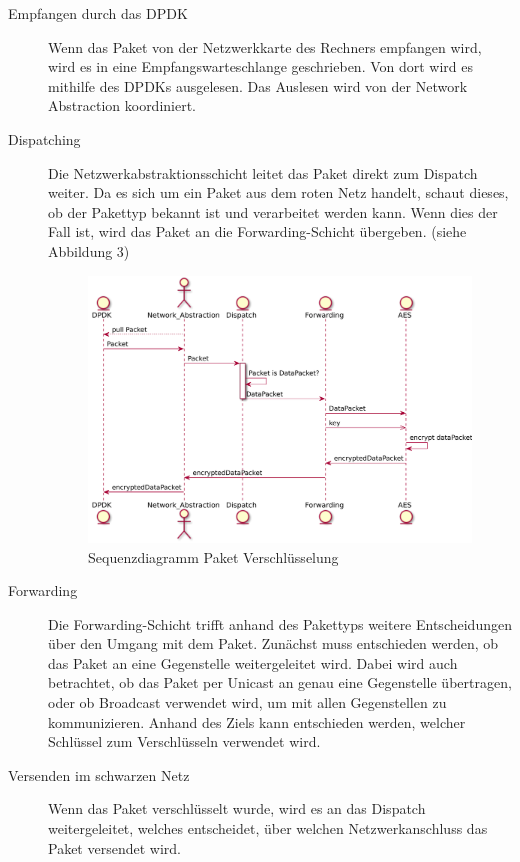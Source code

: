 \documentclass[a4paper, 11pt, ngerman, fleqn]{article}
\begin{document}
\begin{description}

\item[Empfangen durch das DPDK]
Wenn das Paket von der Netzwerkkarte des Rechners empfangen wird, wird es in eine Empfangswarteschlange geschrieben. 
Von dort wird es mithilfe des DPDKs ausgelesen.
Das Auslesen wird von der Network Abstraction koordiniert.

\item[Dispatching]
Die Netzwerkabstraktionsschicht leitet das Paket direkt zum Dispatch weiter. 
Da es sich um ein Paket aus dem roten Netz handelt, schaut dieses, ob der Pakettyp bekannt ist und verarbeitet werden kann.
Wenn dies der Fall ist, wird das Paket an die Forwarding-Schicht übergeben. (siehe Abbildung 3)

\begin{figure}
	\begin{center}
		\includegraphics[width = 14cm]{figures/sequenceDiagramDataPacketEncryption.pdf}
		\caption{Sequenzdiagramm Paket Verschlüsselung}
	\end{center}
\end{figure}

\item[Forwarding]
Die Forwarding-Schicht trifft anhand des Pakettyps weitere Entscheidungen über den Umgang mit dem Paket.
Zunächst muss entschieden werden, ob das Paket an eine Gegenstelle weitergeleitet wird.
Dabei wird auch betrachtet, ob das Paket per Unicast an genau eine Gegenstelle übertragen, oder ob Broadcast verwendet wird, um mit allen Gegenstellen zu kommunizieren.
Anhand des Ziels kann entschieden werden, welcher Schlüssel zum Verschlüsseln verwendet wird.

\item[Versenden im schwarzen Netz]
Wenn das Paket verschlüsselt wurde, wird es an das Dispatch weitergeleitet, welches entscheidet, über welchen Netzwerkanschluss das Paket versendet wird.

\end{description}
\end{document}

